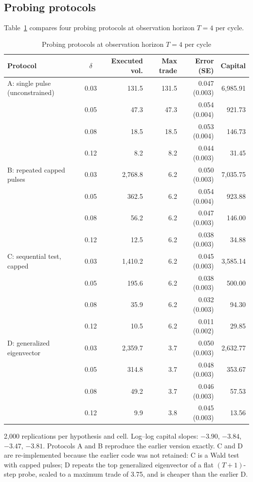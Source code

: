 \documentclass[12pt]{article}
\theoremstyle{definition}
\theoremstyle{remark}
\begin{document}
\subsection{Probing protocols}
Table~\ref{tab:protocols} compares four probing protocols at observation horizon $T=4$ per cycle.

\begin{table}[!htbp]\centering\small
\begin{threeparttable}
\caption{Probing protocols at observation horizon $T=4$ per cycle}\label{tab:protocols}
\begin{tabular}{lcrrrr}
\toprule
Protocol & $\delta$ & Executed vol. & Max trade & Error (SE) & Capital\\
\midrule
A: single pulse (unconstrained) & 0.03 & 131.5 & 131.5 & 0.047 (0.003) & 6{,}985.91\\
 & 0.05 & 47.3 & 47.3 & 0.054 (0.004) & 921.73\\
 & 0.08 & 18.5 & 18.5 & 0.053 (0.004) & 146.73\\
 & 0.12 & 8.2 & 8.2 & 0.044 (0.003) & 31.45\\
B: repeated capped pulses & 0.03 & 2{,}768.8 & 6.2 & 0.050 (0.003) & 7{,}035.75\\
 & 0.05 & 362.5 & 6.2 & 0.054 (0.004) & 923.88\\
 & 0.08 & 56.2 & 6.2 & 0.047 (0.003) & 146.00\\
 & 0.12 & 12.5 & 6.2 & 0.038 (0.003) & 34.88\\
C: sequential test, capped & 0.03 & 1{,}410.2 & 6.2 & 0.045 (0.003) & 3{,}585.14\\
 & 0.05 & 195.6 & 6.2 & 0.038 (0.003) & 500.00\\
 & 0.08 & 35.9 & 6.2 & 0.032 (0.003) & 94.30\\
 & 0.12 & 10.5 & 6.2 & 0.011 (0.002) & 29.85\\
D: generalized eigenvector & 0.03 & 2{,}359.7 & 3.7 & 0.050 (0.003) & 2{,}632.77\\
 & 0.05 & 314.8 & 3.7 & 0.048 (0.003) & 353.67\\
 & 0.08 & 49.2 & 3.7 & 0.046 (0.003) & 57.53\\
 & 0.12 & 9.9 & 3.8 & 0.045 (0.003) & 13.56\\
\bottomrule
\end{tabular}
\begin{tablenotes}\footnotesize\item 2{,}000 replications per hypothesis and cell. Log--log capital slopes: $-3.90$, $-3.84$, $-3.47$, $-3.81$. Protocols A and B reproduce the earlier version exactly. C and D are re-implemented because the earlier code was not retained: C is a Wald test with capped pulses; D repeats the top generalized eigenvector of a flat $(T+1)$-step probe, scaled to a maximum trade of 3.75, and is cheaper than the earlier D.\end{tablenotes}
\end{threeparttable}
\end{table}
\end{document}
